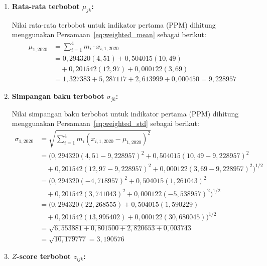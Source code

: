 \begin{enumerate}
    \item \textbf{Rata-rata terbobot $\mu_{jk}$:}

    Nilai rata-rata terbobot untuk indikator pertama (PPM) dihitung menggunakan Persamaan~\ref{eq:weighted_mean} sebagai berikut:
    \begin{align*}
        \mu_{1,2020} &= \sum_{i=1}^{4} m_i \cdot x_{i,1,2020} \\
        &= 0{,}294320(4{,}51) + 0{,}504015(10{,}49) \\
        &\quad + 0{,}201542(12{,}97) + 0{,}000122(3{,}69) \\
        &= 1{,}327383 + 5{,}287117 + 2{,}613999 + 0{,}000450 = 9{,}228957
    \end{align*}

    \item \textbf{Simpangan baku terbobot $\sigma_{jk}$:}

    Nilai simpangan baku terbobot untuk indikator pertama (PPM) dihitung menggunakan Persamaan~\ref{eq:weighted_std} sebagai berikut:
    {\small
    \begin{align*}
        \sigma_{1,2020} &= \sqrt{\sum_{i=1}^{4} m_i (x_{i,1,2020} - \mu_{1,2020})^2} \\
        &= \Big(0{,}294320(4{,}51 - 9{,}228957)^2 + 0{,}504015(10{,}49 - 9{,}228957)^2 \\
        &\quad + 0{,}201542(12{,}97 - 9{,}228957)^2 + 0{,}000122(3{,}69 - 9{,}228957)^2\Big)^{1/2} \\
        &= \Big(0{,}294320(-4{,}718957)^2 + 0{,}504015(1{,}261043)^2 \\
        &\quad + 0{,}201542(3{,}741043)^2 + 0{,}000122(-5{,}538957)^2\Big)^{1/2} \\
        &= \Big(0{,}294320(22{,}268555) + 0{,}504015(1{,}590229) \\
        &\quad + 0{,}201542(13{,}995402) + 0{,}000122(30{,}680045)\Big)^{1/2} \\
        &= \sqrt{6{,}553881 + 0{,}801500 + 2{,}820653 + 0{,}003743} \\
        &= \sqrt{10{,}179777} = 3{,}190576
    \end{align*}
    }

    \item \textbf{$Z$-score terbobot $z_{ijk}$:}


\end{enumerate}
